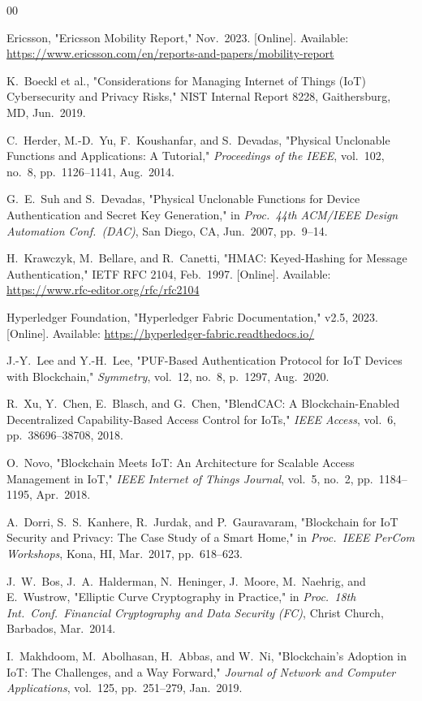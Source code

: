 \documentclass[conference]{IEEEtran}
\begin{document}
\begin{thebibliography}{00}

Ericsson,
"Ericsson Mobility Report,"
Nov.\ 2023.
[Online]. Available: \url{https://www.ericsson.com/en/reports-and-papers/mobility-report}

K.\ Boeckl et al.,
"Considerations for Managing Internet of Things (IoT) Cybersecurity and Privacy Risks,"
NIST Internal Report 8228, Gaithersburg, MD, Jun.\ 2019.

C.\ Herder, M.-D.\ Yu, F.\ Koushanfar, and S.\ Devadas,
"Physical Unclonable Functions and Applications: A Tutorial,"
\textit{Proceedings of the IEEE}, vol.\ 102, no.\ 8, pp.\ 1126--1141, Aug.\ 2014.

G.\ E.\ Suh and S.\ Devadas,
"Physical Unclonable Functions for Device Authentication and Secret Key Generation,"
in \textit{Proc.\ 44th ACM/IEEE Design Automation Conf.\ (DAC)},
San Diego, CA, Jun.\ 2007, pp.\ 9--14.

H.\ Krawczyk, M.\ Bellare, and R.\ Canetti,
"HMAC: Keyed-Hashing for Message Authentication,"
IETF RFC 2104, Feb.\ 1997.
[Online]. Available: \url{https://www.rfc-editor.org/rfc/rfc2104}

Hyperledger Foundation,
"Hyperledger Fabric Documentation," v2.5,
2023.
[Online]. Available: \url{https://hyperledger-fabric.readthedocs.io/}

J.-Y.\ Lee and Y.-H.\ Lee,
"PUF-Based Authentication Protocol for IoT Devices with Blockchain,"
\textit{Symmetry}, vol.\ 12, no.\ 8, p.\ 1297, Aug.\ 2020.

R.\ Xu, Y.\ Chen, E.\ Blasch, and G.\ Chen,
"BlendCAC: A Blockchain-Enabled Decentralized Capability-Based Access Control for IoTs,"
\textit{IEEE Access}, vol.\ 6, pp.\ 38696--38708, 2018.

O.\ Novo,
"Blockchain Meets IoT: An Architecture for Scalable Access Management in IoT,"
\textit{IEEE Internet of Things Journal}, vol.\ 5, no.\ 2,
pp.\ 1184--1195, Apr.\ 2018.

A.\ Dorri, S.\ S.\ Kanhere, R.\ Jurdak, and P.\ Gauravaram,
"Blockchain for IoT Security and Privacy: The Case Study of a Smart Home,"
in \textit{Proc.\ IEEE PerCom Workshops}, Kona, HI, Mar.\ 2017, pp.\ 618--623.

J.\ W.\ Bos, J.\ A.\ Halderman, N.\ Heninger, J.\ Moore, M.\ Naehrig,
and E.\ Wustrow,
"Elliptic Curve Cryptography in Practice,"
in \textit{Proc.\ 18th Int.\ Conf.\ Financial Cryptography and Data Security (FC)},
Christ Church, Barbados, Mar.\ 2014.

I.\ Makhdoom, M.\ Abolhasan, H.\ Abbas, and W.\ Ni,
"Blockchain's Adoption in IoT: The Challenges, and a Way Forward,"
\textit{Journal of Network and Computer Applications}, vol.\ 125,
pp.\ 251--279, Jan.\ 2019.

\end{thebibliography}
\end{document}
